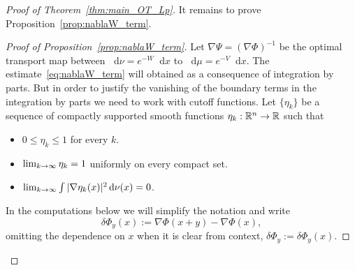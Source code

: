\documentclass[AHL,Unicode,longabstracts]{cedram}
\newcommand{\R}{\mathbb R}
\newcommand{\V}{V}
\newcommand{\W}{W}
\newcommand{\dd}{n}
\newcommand{\source}{\mu}
\newcommand{\target}{\nu}
\newcommand*\diff{\mathop{}\!\mathrm{d}}
\newcommand{\OT}{\Phi}
\newcommand{\findiff}{\delta\OT}
\renewcommand*{\to}{\mathchoice{\longrightarrow}{\rightarrow}{\rightarrow}{\rightarrow}}
\begin{document}
\begin{proof}[Proof of Theorem~\ref{thm:main_OT_Lp}]
It remains to prove Proposition~\ref{prop:nablaW_term}.
\begin{proof}[Proof of Proposition~\ref{prop:nablaW_term}]
Let $\nabla\Psi=(\nabla \OT)^{-1}$ be the optimal transport map between $\diff \target=e^{-\W}\diff x$ to $\diff \source=e^{-\V}\diff x$. The estimate~\eqref{eq:nablaW_term} will obtained as a consequence of integration by parts. But in order to justify the vanishing of the boundary terms in the integration by parts we need to work with cutoff functions. Let $\{\eta_k\}$ be a sequence of compactly supported smooth functions $\eta_k:\R^{\dd}\to \R$ such that
\begin{itemize}
\item $0\le \eta_k\le 1$ for every $k$.
\item $\lim_{k\to\infty}\eta_k=1$ uniformly on every compact set.
\item $\lim_{k\to\infty}\int |\nabla\eta_k(x)|^2 \diff\target(x)=0$.
\end{itemize}
In the computations below we will simplify the notation and write
\[
\findiff_y(x):=\nabla \OT(x+y)-\nabla \OT(x),
\]
omitting the dependence on $x$ when it is clear from context, $\findiff_y:=\findiff_y(x)$.


\end{proof}
\end{proof}
\end{document}
